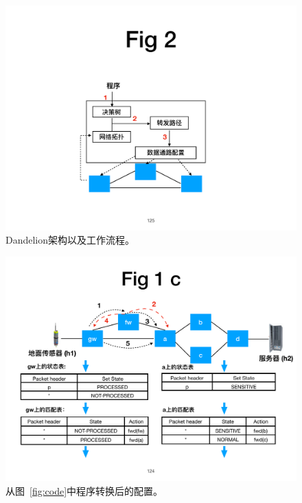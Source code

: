 \documentclass{ctexart}
\begin{document}
\begin{figure}[!htbp]
\centering

      \centering\includegraphics[width=\linewidth]{figures/ss-125.pdf}
\caption{Dandelion架构以及工作流程。}
\label{fig:system-workflow}
\end{figure}

\begin{figure}[!htbp]
\centering
      \centering\includegraphics[width=0.8\linewidth]{figures/ss-124.pdf}
	\caption{从图~\ref{fig:code}中程序转换后的配置。}
\label{fig:dsdc-result}
\end{figure}
\end{document}
